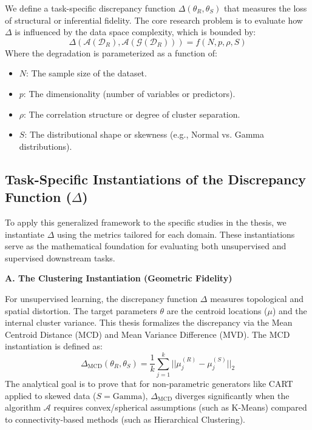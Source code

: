 We define a task-specific discrepancy function $\Delta(\theta_{R}, \theta_{S})$ that measures the loss of structural or inferential fidelity. The core research problem is to evaluate how $\Delta$ is influenced by the data space complexity, which is bounded by:
\begin{equation}
    \Delta(\mathcal{A}(\mathcal{D}_{R}), \mathcal{A}(\mathcal{G}(\mathcal{D}_{R}))) = f(N, p, \rho, S)
\end{equation}
Where the degradation is parameterized as a function of:
\begin{itemize}
    \item $N$: The sample size of the dataset.
    \item $p$: The dimensionality (number of variables or predictors).
    \item $\rho$: The correlation structure or degree of cluster separation.
    \item $S$: The distributional shape or skewness (e.g., Normal vs. Gamma distributions).
\end{itemize}

\subsection{Task-Specific Instantiations of the Discrepancy Function \texorpdfstring{($\Delta$)}{(Delta)}}
To apply this generalized framework to the specific studies in the thesis, we instantiate $\Delta$ using the metrics tailored for each domain. These instantiations serve as the mathematical foundation for evaluating both unsupervised and supervised downstream tasks.

\textbf{A. The Clustering Instantiation (Geometric Fidelity)}

For unsupervised learning, the discrepancy function $\Delta$ measures topological and spatial distortion. The target parameters $\theta$ are the centroid locations ($\mu$) and the internal cluster variance. This thesis formalizes the discrepancy via the Mean Centroid Distance (MCD) and Mean Variance Difference (MVD). The MCD instantiation is defined as:
\begin{equation}
    \Delta_{\text{MCD}}(\theta_{R}, \theta_{S}) = \frac{1}{k}\sum_{j=1}^{k}||\mu_{j}^{(R)}-\mu_{j}^{(S)}||_{2}
\end{equation}
The analytical goal is to prove that for non-parametric generators like CART applied to skewed data ($S = \text{Gamma}$), $\Delta_{\text{MCD}}$ diverges significantly when the algorithm $\mathcal{A}$ requires convex/spherical assumptions (such as K-Means) compared to connectivity-based methods (such as Hierarchical Clustering).

